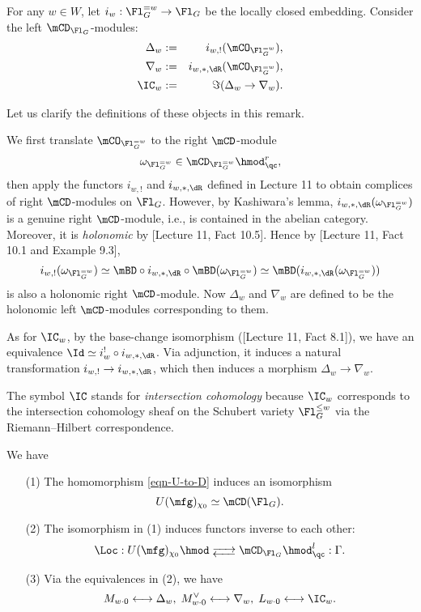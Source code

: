 	\begin{constr}
		For any $w\in W$, let $i_w: \Fl_G^{=w}\to \Fl_G$ be the locally closed embedding. Consider the left $\mCD_{\Fl_G}$-modules:
		\begin{eqnarray*}
			\Delta_w &:=&  i_{w,!}(\mCO_{\Fl_G^{=w}}),\\
			\nabla_w &:=& i_{w,*,\dR}(\mCO_{\Fl_G^{=w}}),\\
			\IC_w &:=& \Im( \Delta_w \to \nabla_w ).
		\end{eqnarray*}
	\end{constr}

	\begin{rem}
		Let us clarify the definitions of these objects in this remark.

		We first translate $\mCO_{\Fl_G^{=w}}$ to the right $\mCD$-module 
		\[
			\omega_{\Fl_G^{=w}} \in \mCD_{\Fl_G^{=w}}\hmod_\qc^r,
		\]
		then apply the functors $i_{w,!}$ and $i_{w,*,\dR}$ defined in Lecture 11 to obtain complices of right $\mCD$-modules on $\Fl_G$. However, by Kashiwara's lemma, $i_{w,*,\dR}(\omega_{\Fl_G^{=w}})$ is a genuine right $\mCD$-module, i.e., is contained in the abelian category. Moreover, it is \emph{holonomic} by [Lecture 11, Fact 10.5]. Hence by [Lecture 11, Fact 10.1 and Example 9.3], 
		\[
			i_{w,!}(\omega_{\Fl_G^{=w}}) \simeq \mBD \circ i_{w,*,\dR} \circ \mBD (\omega_{\Fl_G^{=w}}) \simeq \mBD(i_{w,*,\dR}(\omega_{\Fl_G^{=w}}))
		\]
		is also a holonomic right $\mCD$-module. Now $\Delta_w $ and $\nabla_w $ are defined to be the holonomic left $\mCD$-modules corresponding to them.

		As for $\IC_w$, by the base-change isomorphism ([Lecture 11, Fact 8.1]), we have an equivalence $\Id \simeq i_{w}^! \circ i_{w,*,\dR}$. Via adjunction, it induces a natural transformation $i_{w,!} \to i_{w,*,\dR}$, which then induces a morphism $\Delta_w \to \nabla_w$.
	\end{rem}

	\begin{rem}
		The symbol $\IC$ stands for \emph{intersection cohomology} because $\IC_w$ corresponds to the intersection cohomology sheaf on the Schubert variety $\Fl_G^{\le w}$ via the Riemann--Hilbert correspondence.
	\end{rem}


	\begin{thm}
		\label{thm-localization}
		We have
		\begin{itemize}
			\item[(1)]
				The homomorphism \eqref{eqn-U-to-D} induces an isomorphism
				\[
					U(\mfg)_{\chi_0} \simeq \mCD(\Fl_G).
				\]
			\item[(2)]
				The isomorphism in (1) induces functors inverse to each other:
				\[
					\Loc: U(\mfg)_{\chi_0}\hmod \adj \mCD_{\Fl_G}\hmod_\qc^l : \Gamma.
				\]
			\item[(3)]
				Via the equivalences in (2), we have
				\[
					M_{w\cdot 0} \longleftrightarrow \Delta_w,\; M^\vee_{w\cdot 0} \longleftrightarrow \nabla_w,\; L_{w\cdot 0} \longleftrightarrow \IC_w.
				\]
		\end{itemize}
	\end{thm}

